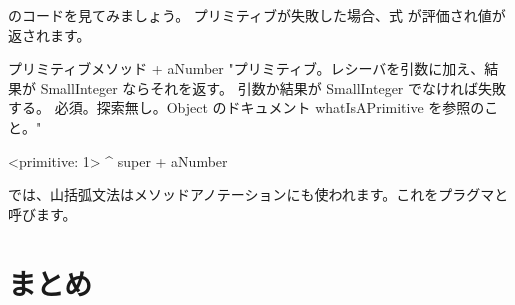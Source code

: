 \documentclass[a4paper,10pt,twoside]{book}
\begin{document}
のコードを見てみましょう。
プリミティブが失敗した場合、式  が評価され値が返されます。

\begin{method}[primitive]{プリミティブメソッド}
+ aNumber 
  "プリミティブ。レシーバを引数に加え、結果が SmallInteger ならそれを返す。
  引数か結果が SmallInteger でなければ失敗する。
  必須。探索無し。Object のドキュメント whatIsAPrimitive を参照のこと。"

  <primitive: 1>
  ^ super + aNumber
\end{method}





\pharo では、山括弧文法はメソッドアノテーションにも使われます。これをプラグマと呼びます。

\section{まとめ}
\end{document}
